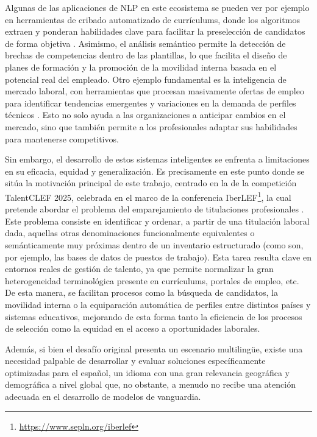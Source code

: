 Algunas de las aplicaciones de \gls{NLP} en este ecosistema se pueden ver por ejemplo en herramientas de cribado automatizado de currículums, donde los algoritmos extraen y ponderan habilidades clave para facilitar la preselección de candidatos de forma objetiva \cite{laumer2022hr}. Asimismo, el análisis semántico permite la detección de brechas de competencias dentro de las plantillas, lo que facilita el diseño de planes de formación y la promoción de la movilidad interna basada en el potencial real del empleado. Otro ejemplo fundamental es la inteligencia de mercado laboral, con herramientas que procesan masivamente ofertas de empleo para identificar tendencias emergentes y variaciones en la demanda de perfiles técnicos \cite{sharma2025intersection}. Esto no solo ayuda a las organizaciones a anticipar cambios en el mercado, sino que también permite a los profesionales adaptar sus habilidades para mantenerse competitivos.

Sin embargo, el desarrollo de estos sistemas inteligentes se enfrenta a limitaciones en su eficacia, equidad y generalización. Es precisamente en este punto donde se sitúa la motivación principal de este trabajo, centrado en la  de la competición TalentCLEF 2025, celebrada en el marco de la conferencia IberLEF\footnote{\url{https://www.sepln.org/iberlef}}, la cual pretende abordar el problema del emparejamiento de titulaciones profesionales \cite{gasco2025brief}. Este problema consiste en identificar y ordenar, a partir de una titulación laboral dada, aquellas otras denominaciones funcionalmente equivalentes o semánticamente muy próximas dentro de un inventario estructurado (como son, por ejemplo, las bases de datos de puestos de trabajo). Esta tarea resulta clave en entornos reales de gestión de talento, ya que permite normalizar la gran heterogeneidad terminológica presente en currículums, portales de empleo, etc. De esta manera, se facilitan procesos como la búsqueda de candidatos, la movilidad interna o la equiparación automática de perfiles entre distintos países y sistemas educativos, mejorando de esta forma tanto la eficiencia de los procesos de selección como la equidad en el acceso a oportunidades laborales.

Además, si bien el desafío original presenta un escenario multilingüe, existe una necesidad palpable de desarrollar y evaluar soluciones específicamente optimizadas para el español, un idioma con una gran relevancia geográfica y demográfica a nivel global que, no obstante, a menudo no recibe una atención adecuada en el desarrollo de modelos de vanguardia.

